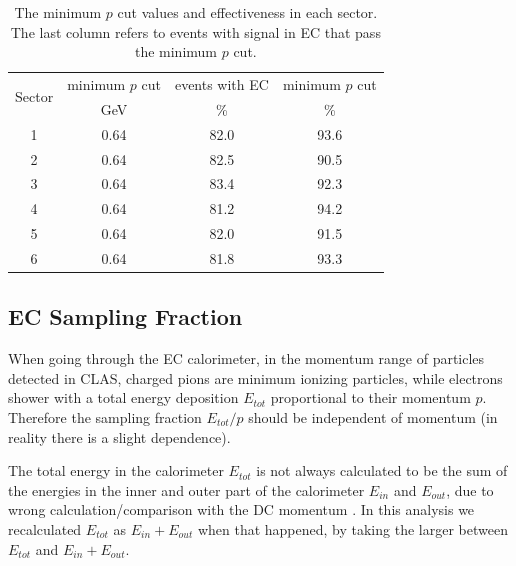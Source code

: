 \begin{table}[h]
\label{tab:pmincut}
	\begin{center}
		\begin{tabular}{c | c | c | c}
			\hline 
			\multirow{2}{*}{Sector} 
					& minimum $p$ cut & events with EC & minimum $p$ cut \\
					&  GeV & \% & \% \\
			\hline 
			1   & 0.64 & 82.0 & 93.6 \\
			2   & 0.64 & 82.5 & 90.5 \\
			3   & 0.64 & 83.4 & 92.3 \\
			4   & 0.64 & 81.2 & 94.2 \\
			5   & 0.64 & 82.0 & 91.5 \\
			6   & 0.64 & 81.8 & 93.3 \\
			\hline
		\end{tabular}
		\caption{The minimum $p$ cut values and effectiveness in each sector.
					The last column refers to events with signal in EC that pass the 
 					minimum $p$ cut.}	
	
	\end{center}
\end{table}

\subsection{EC Sampling Fraction}
When going through the EC calorimeter, in the momentum range of particles detected in CLAS, 
charged pions are minimum ionizing particles, while electrons shower with a total energy 
deposition $E_{tot}$ proportional to their momentum $p$. 
Therefore the sampling fraction $E_{tot}/p$ should be independent of momentum (in reality there 
is a slight dependence).

The total energy in the calorimeter $E_{tot}$ is not always calculated to be the sum of the 
energies in the inner and outer part of the calorimeter $E_{in}$ and $E_{out}$, due to wrong 
calculation/comparison with the DC momentum \cite{bib:ectotmax}. In this analysis we
recalculated $E_{tot}$ as $E_{in}+E_{out}$ when that happened, by taking the larger
between $E_{tot}$ and $E_{in}+E_{out}$.

